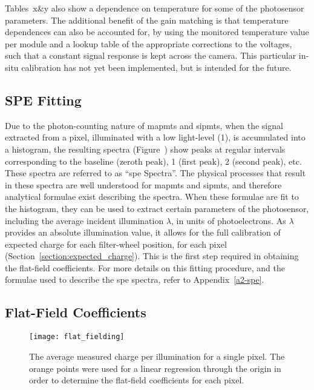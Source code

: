 Tables~x\&y also show a dependence on temperature for some of the photosensor parameters. The additional benefit of the gain matching is that temperature dependences can also be accounted for, by using the monitored temperature value per module and a lookup table of the appropriate corrections to the voltages, such that a constant signal response is kept across the camera. This particular in-situ calibration has not yet been implemented, but is intended for the future.


\subsection{SPE Fitting}

Due to the photon-counting nature of \glspl{mapmt} and \glspl{sipmt}, when the signal extracted from a pixel, illuminated with a low light-level (\utilde\SI{1}{\pe}), is accumulated into a histogram, the resulting spectra (Figure~) show peaks at regular intervals corresponding to the baseline (zeroth peak), \SI{1}{\pe} (first peak), \SI{2}{\pe} (second peak), etc. These spectra are referred to as ``\gls{spe} Spectra''. The physical processes that result in these spectra are well understood for \glspl{mapmt} and \glspl{sipmt}, and therefore analytical formulae  exist describing the spectra. When these formulae are fit to the histogram, they can be used to extract certain parameters of the photosensor, including the average incident illumination $\lambda$, in units of photoelectrons. As $\lambda$ provides an absolute illumination value, it allows for the full calibration of expected charge for each filter-wheel position, for each pixel (Section~\ref{section:expected_charge}). This is the first step required in obtaining the flat-field coefficients. For more details on this fitting procedure, and the formulae used to describe the \gls{spe} spectra, refer to Appendix~\ref{a2-spe}.

\subsection{Flat-Field Coefficients}

\begin{figure}
	\centering
    \texttt{[image: flat\_fielding]} 
	\caption[Flat-field calibration]{The average measured charge per illumination for a single pixel. The orange points were used for a linear regression through the origin in order to determine the flat-field coefficients for each pixel.} 
	\label{fig:flat_fielding}
\end{figure}

